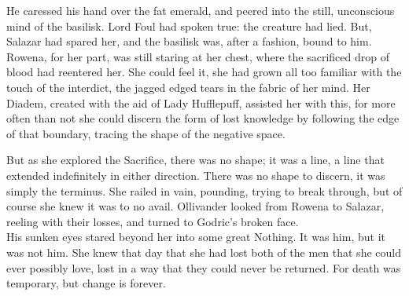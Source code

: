 He caressed his hand over the fat emerald, and peered into the still, unconscious mind of the basilisk. Lord Foul had spoken true: the creature had lied. But, Salazar had spared her, and the basilisk was, after a fashion, bound to him.
\SomeVSpace
Rowena, for her part, was still staring at her chest, where the sacrificed drop of blood had reentered her. She could feel it, she had grown all too familiar with the touch of the interdict, the jagged edged tears in the fabric of her mind. Her Diadem, created with the aid of Lady Hufflepuff, assisted her with this, for more often than not she could discern the form of lost knowledge by following the edge of that boundary, tracing the shape of the negative space.

But as she explored the Sacrifice, there was no shape; it was a line, a line that extended indefinitely in either direction. There was no shape to discern, it was simply the terminus. She railed in vain, pounding, trying to break through, but of course she knew it was to no avail.
\SomeVSpace
Ollivander looked from Rowena to Salazar, reeling with their losses, and turned to Godric’s broken face.\\His sunken eyes stared beyond her into some great Nothing. It was him, but it was not him.
\SmallVSpace
She knew that day that she had lost both of the men that she could ever possibly love, lost in a way that they could never be returned. For death was temporary, but change is forever.
\simpleline
{}